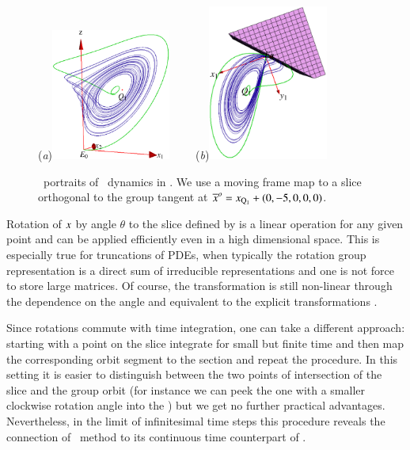 {%
\begin{figure}[ht]
\begin{center}
  (\textit{a})\includegraphics[width=0.35\textwidth,clip=true]{../figs/CLEmfAdHoc1}
~~~~(\textit{b})\includegraphics[width=0.35\textwidth,clip=true]{../figs/CLEmfAdHoc135}
\end{center}
\caption{
\Statesp\ portraits of \cLe\ dynamics in \reducedsp. We use a
moving frame map to a slice orthogonal to the group tangent
at ${\overline{x}^o}  = x_{\mathrm{Q}_{1}}+(0,-5,0,0,0)$.
    }
\label{fig:CLEmfAdHoc}
\end{figure}


}%


Rotation of $x$ by angle $\theta$
to the slice defined by  is a linear operation
for any given point and can be applied efficiently
even in a high dimensional space. This is especially true
for truncations of PDEs, when typically the rotation group
representation is a direct sum of irreducible
representations and one is not force to store large matrices.
Of course, the transformation is still non-linear
through the dependence on the angle and equivalent to the
explicit transformations .


Since rotations commute with time integration, one can take a
different approach: starting with a point on the slice
integrate for small but finite time and then map the
corresponding orbit segment to the section and repeat the
procedure. In this setting it is easier to distinguish
between the two points of intersection of the slice and the
group orbit (for instance we can peek the one with a smaller
clockwise rotation angle into the \slice) but we get no
further practical advantages. Nevertheless, in the limit of
infinitesimal time steps this procedure reveals the
connection of \mframes\ method to its continuous time
counterpart of .
